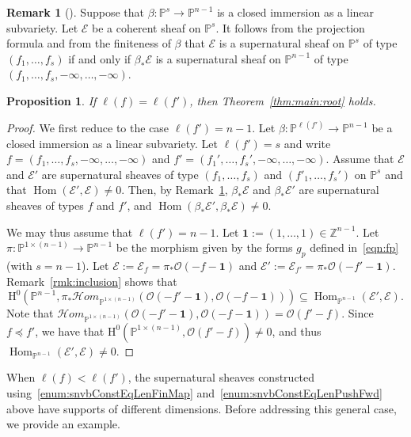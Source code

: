 \documentclass[12pt]{amsart}
\newtheorem{prop}[equation]{Proposition}
\theoremstyle{definition}
\newtheorem{rmk}[equation]{Remark}
\newenvironment{remark}[1][]{\begin{rmk}[#1] \pushQED{\qed}}{\popQED \end{rmk}}
\newcommand{\Hom}{\operatorname{Hom}}
\newcommand{\sheafHom}{\mathcal{H}om}
\newcommand{\Hs}{\mathrm{H}}
\newcommand{\EE}{\mathcal{E}}
\newcommand{\cO}{{\mathcal O}}
\newcommand{\PP}{\mathbb{P}}
\newcommand{\ZZ}{\mathbb{Z}}
\begin{document}
\begin{remark}
\label{remark:pushFwdSupNat}
Suppose that $\beta \colon \PP^s \to \PP^{n-1}$ is a closed immersion 
as a linear subvariety. 
Let $\EE$ be a coherent sheaf on $\PP^s$.
It follows from the projection formula and from the finiteness of $\beta$ that
$\EE$ is a supernatural sheaf
on $\PP^s$ of type $(f_1, \ldots, f_s)$ if and only if $\beta_*\EE$ is a
supernatural sheaf on $\PP^{n-1}$ of type 
$(f_1, \ldots, f_s, -\infty, \ldots, -\infty)$.
\end{remark}

\begin{prop}
\label{propn:rootSameLength}
If $\ell(f) = \ell(f')$, then Theorem~\ref{thm:main:root} holds.
\end{prop}

\begin{proof}
We first reduce to the case $\ell(f')=n-1$. 
Let $\beta\colon\PP^{\ell(f')} \to \PP^{n-1}$ be a closed immersion as a
linear subvariety. 
Let $\ell(f')=s$ and write $f=(f_1, \dots, f_s, -\infty, \dots, -\infty)$ and
$f'=(f_1', \dots, f_s', -\infty, \dots, -\infty)$. 
Assume that $\EE$ and $\EE'$ are supernatural sheaves 
of type $(f_1, \dots, f_s)$ and $(f'_1, \dots, f_s')$ on $\PP^{s}$ and that 
$\Hom(\EE', \EE)\ne 0$.  Then, by Remark~\ref{remark:pushFwdSupNat}, 
$\beta_*\EE$ and $\beta_*\EE'$ are supernatural sheaves of types $f$ and $f'$, 
and $\Hom(\beta_*\EE', \beta_*\EE) \neq 0$.

We may thus assume that $\ell(f')=n-1$.  
Let $\mathbf{1} := (1,\dots,1) \in\ZZ^{n-1}$.  
Let $\pi\colon \PP^{1 \times (n-1)} \to \PP^{n-1}$ be the morphism given by 
the forms $g_p$ defined in~\eqref{eqn:fp} (with $s=n-1$). 
Let $\EE := \EE_f=  \pi_* \cO(-f-\mathbf 1)$ and 
$\EE' := \EE_{f'}= \pi_*\cO(-f'-\mathbf{1})$. 
Remark~\ref{rmk:inclusion} shows that  
\[
\Hs^0\left(\PP^{n-1}, \pi_* \sheafHom_{\PP^{1\times (n-1)}}\left(
\cO(-f'-\mathbf{1}), \cO(-f-\mathbf{1}) \right) \right) \subseteq
\Hom_{\PP^{n-1}}(\EE',\EE).
\]
Note that
$\sheafHom_{\PP^{1\times (n-1)}}\left(
\cO(-f'-\mathbf{1}), \cO(-f-\mathbf{1}) 
\right) = \cO( f' - f )$. 
Since $f \preceq f'$, we have that 
$\Hs^0(\PP^{1\times (n-1)}, \cO( f'- f ))\ne 0$, 
and thus $\Hom_{\PP^{n-1}}(\EE',\EE) \neq 0$.
\end{proof}

When $\ell(f) < \ell(f')$, the supernatural sheaves 
constructed using~\eqref{enum:snvbConstEqLenFinMap} 
and~\eqref{enum:snvbConstEqLenPushFwd} above have supports 
of different dimensions. 
Before addressing this general case, we provide an example. 
\end{document}

